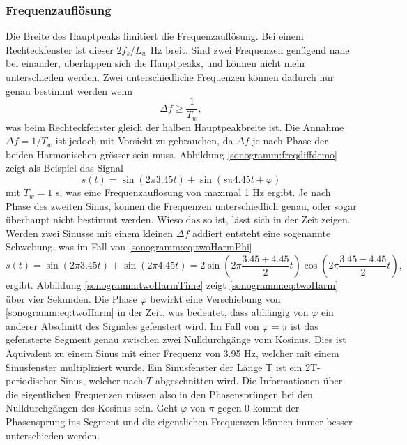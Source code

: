 \subsubsection{Frequenzauflösung}
Die Breite des Hauptpeaks limitiert die Frequenzauflösung.
Bei einem Rechteckfenster ist dieser $2f_s/L_w$ Hz breit.
Sind zwei Frequenzen genügend nahe bei einander, überlappen sich die Hauptpeaks, und können
nicht mehr unterschieden werden. 
Zwei unterschiedliche Frequenzen können dadurch nur genau bestimmt werden wenn
\begin{equation}
    \Delta f \geq \frac{1}{T_w},
\end{equation}
was beim Rechteckfenster gleich der halben Hauptpeakbreite ist.
Die Annahme $\Delta f = 1/T_w$ ist jedoch mit Vorsicht zu gebrauchen, da $\Delta f$ je nach 
Phase der beiden Harmonischen grösser sein muss.
Abbildung \ref{sonogramm:freqdiffdemo} zeigt als Beispiel das Signal
\begin{equation}
    s(t) = \sin(2\pi 3.45 t ) + \sin (s\pi 4.45 t + \varphi)
    \label{sonogramm:eq:twoHarmPhi}
\end{equation}
mit $T_w = 1$ s, was eine Frequenzauflösung von maximal 1 Hz ergibt.
Je nach Phase des zweiten Sinus, können die Frequenzen unterschiedlich genau, oder sogar überhaupt nicht
bestimmt werden.
Wieso das so ist, lässt sich in der Zeit zeigen.
Werden zwei Sinusse mit einem kleinen $\Delta f$ addiert entsteht eine sogenannte Schwebung,
was im Fall von \eqref{sonogramm:eq:twoHarmPhi}
\begin{equation}
    s(t) = \sin(2\pi 3.45 t ) + \sin (2\pi 4.45 t) = 2 \sin\left(2 \pi \frac{3.45 + 4.45}{2}t\right)
    \cos\left(2 \pi  \frac{3.45 - 4.45}{2} t\right),
\label{sonogramm:eq:twoHarm}
\end{equation}
ergibt.
Abbildung \ref{sonogramm:twoHarmTime} zeigt \eqref{sonogramm:eq:twoHarm} über vier Sekunden.
Die Phase $\varphi$ bewirkt eine Verschiebung von \eqref{sonogramm:eq:twoHarm} in der Zeit, 
was bedeutet, dass abhängig von $\varphi$ ein anderer Abschnitt des Signales gefenstert wird.
Im Fall von $\varphi = \pi$ ist das gefensterte Segment genau zwischen zwei Nulldurchgänge
vom Kosinus.
Dies ist Äquivalent zu einem Sinus mit einer Frequenz von 3.95 Hz, welcher mit einem 
Sinusfenster multipliziert wurde. 
Ein Sinusfenster der Länge T ist ein 2T-periodischer Sinus, welcher nach $T$ abgeschnitten wird.
Die Informationen über die eigentlichen Frequenzen müssen also in den Phasensprüngen bei den 
Nulldurchgängen des Kosinus sein.
Geht $\varphi$ von $\pi$ gegen 0 kommt der Phasensprung ins Segment und die eigentlichen Frequenzen
können immer besser unterschieden werden.

